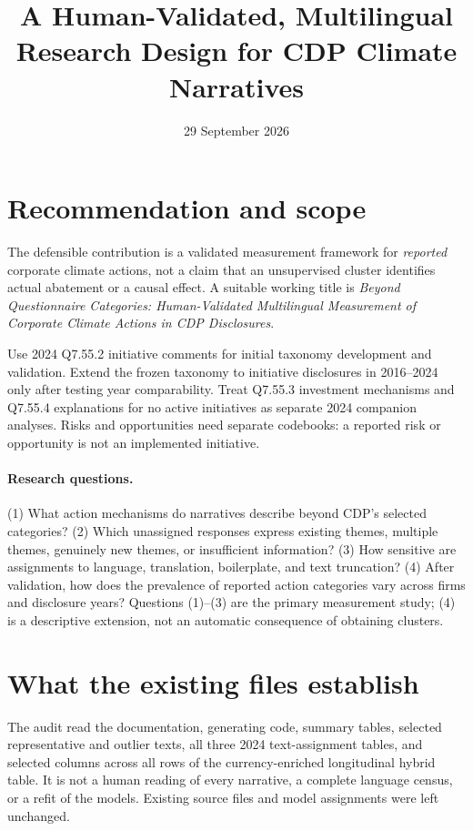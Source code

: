 \documentclass[11pt,a4paper]{article}
\title{A Human-Validated, Multilingual Research Design for CDP Climate Narratives}
\author{}
\date{29 September 2026}
\begin{document}
\maketitle

\section{Recommendation and scope}
The defensible contribution is a validated measurement framework for
\emph{reported} corporate climate actions, not a claim that an unsupervised
cluster identifies actual abatement or a causal effect. A suitable working
title is \emph{Beyond Questionnaire Categories: Human-Validated Multilingual
Measurement of Corporate Climate Actions in CDP Disclosures}.

Use 2024 Q7.55.2 initiative comments for initial taxonomy development and
validation. Extend the frozen taxonomy to initiative disclosures in
2016--2024 only after testing year comparability. Treat Q7.55.3 investment
mechanisms and Q7.55.4 explanations for no active initiatives as separate
2024 companion analyses. Risks and opportunities need separate codebooks:
a reported risk or opportunity is not an implemented initiative.

\paragraph{Research questions.}
(1) What action mechanisms do narratives describe beyond CDP's selected
categories? (2) Which unassigned responses express existing themes, multiple
themes, genuinely new themes, or insufficient information? (3) How sensitive
are assignments to language, translation, boilerplate, and text truncation?
(4) After validation, how does the prevalence of reported action categories
vary across firms and disclosure years?
Questions (1)--(3) are the primary measurement study; (4) is a descriptive
extension, not an automatic consequence of obtaining clusters.

\section{What the existing files establish}
The audit read the documentation, generating code, summary tables, selected
representative and outlier texts, all three 2024 text-assignment tables, and
selected columns across all rows of the currency-enriched longitudinal
hybrid table. It is not a human reading of every narrative, a complete
language census, or a refit of the models. Existing source files and model
assignments were left unchanged.
\end{document}
